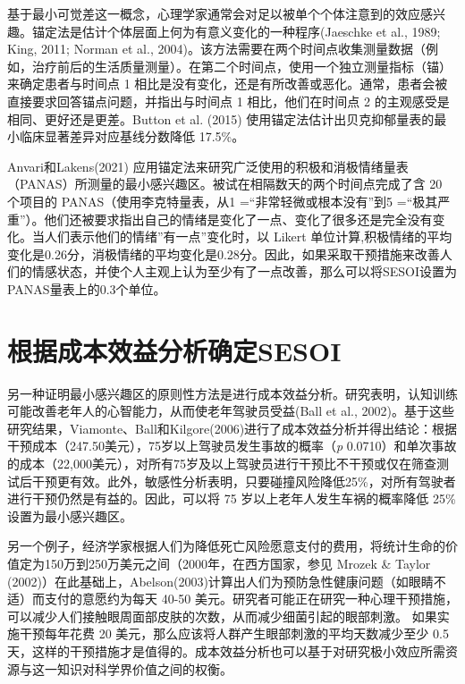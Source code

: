 \documentclass[
  letterpaper,
  DIV=11,
  numbers=noendperiod]{scrreprt}
\begin{document}
基于最小可觉差这一概念，心理学家通常会对足以被单个个体注意到的效应感兴趣。锚定法是估计个体层面上何为有意义变化的一种程序(Jaeschke
et al., 1989; King, 2011; Norman et al.,
2004)。该方法需要在两个时间点收集测量数据（例如，治疗前后的生活质量测量）。在第二个时间点，使用一个独立测量指标（锚）来确定患者与时间点
1
相比是没有变化，还是有所改善或恶化。通常，患者会被直接要求回答锚点问题，并指出与时间点
1 相比，他们在时间点 2 的主观感受是相同、更好还是更差。Button et al.
(2015) 使用锚定法估计出贝克抑郁量表的最小临床显著差异对应基线分数降低
17.5\%。

Anvari和Lakens(2021)
应用锚定法来研究广泛使用的积极和消极情绪量表（PANAS）所测量的最小感兴趣区。被试在相隔数天的两个时间点完成了含
20 个项目的 PANAS（使用李克特量表，从1 =``非常轻微或根本没有''到5
=``极其严重''）。他们还被要求指出自己的情绪是变化了一点、变化了很多还是完全没有变化。当人们表示他们的情绪''有一点''变化时，以
Likert
单位计算,积极情绪的平均变化是0.26分，消极情绪的平均变化是0.28分。因此，如果采取干预措施来改善人们的情感状态，并使个人主观上认为至少有了一点改善，那么可以将SESOI设置为PANAS量表上的0.3个单位。

\hypertarget{ux6839ux636eux6210ux672cux6548ux76caux5206ux6790ux786eux5b9asesoi}{%
\section{根据成本效益分析确定SESOI}\label{ux6839ux636eux6210ux672cux6548ux76caux5206ux6790ux786eux5b9asesoi}}

另一种证明最小感兴趣区的原则性方法是进行成本效益分析。研究表明，认知训练可能改善老年人的心智能力，从而使老年驾驶员受益(Ball
et al.,
2002)。基于这些研究结果，Viamonte、Ball和Kilgore(2006)进行了成本效益分析并得出结论：根据干预成本（247.50美元），75岁以上驾驶员发生事故的概率（\emph{p}
0.0710）和单次事故的成本（22,000美元），对所有75岁及以上驾驶员进行干预比不干预或仅在筛查测试后干预更有效。此外，敏感性分析表明，只要碰撞风险降低25\%，对所有驾驶者进行干预仍然是有益的。因此，可以将
75 岁以上老年人发生车祸的概率降低 25\% 设置为最小感兴趣区。

另一个例子，经济学家根据人们为降低死亡风险愿意支付的费用，将统计生命的价值定为150万到250万美元之间（2000年，在西方国家，参见
Mrozek \& Taylor
(2002)）在此基础上，Abelson(2003)计算出人们为预防急性健康问题（如眼睛不适）而支付的意愿约为每天
40-50
美元。研究者可能正在研究一种心理干预措施，可以减少人们接触眼周面部皮肤的次数，从而减少细菌引起的眼部刺激。
如果实施干预每年花费 20
美元，那么应该将人群产生眼部刺激的平均天数减少至少 0.5
天，这样的干预措施才是值得的。成本效益分析也可以基于对研究极小效应所需资源与这一知识对科学界价值之间的权衡。
\end{document}
